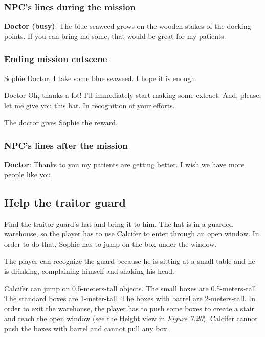 \subsubsection*{NPC's lines during the mission}
\textbf{Doctor (busy)}: The blue seaweed grows on the wooden stakes of the docking points. If you can bring me some, that would be great for my patients.

\subsubsection*{Ending mission cutscene}
\begin{screenplay}

\begin{dialogue}{Sophie}
Doctor, I take some blue seaweed. I hope it is enough.
\end{dialogue}

\begin{dialogue}{Doctor}
Oh, thanks a lot! I'll immediately start making some extract. And, please, let me give you this hat. In recognition of your efforts.
\end{dialogue}

The doctor gives Sophie the reward.

\end{screenplay}

\subsubsection*{NPC's lines after the mission}
\textbf{Doctor}: Thanks to you my patients are getting better. I wish we have more people like you.


\subsection{Help the traitor guard}
Find the traitor guard's hat and bring it to him. The hat is in a guarded warehouse, so the player has to use Calcifer to enter through an open window. In order to do that, Sophie has to jump on the box under the window.

The player can recognize the guard because he is sitting at a small table and he is drinking, complaining himself and shaking his head.

Calcifer can jump on 0,5-meters-tall objects. The small boxes are 0.5-meters-tall. The standard boxes are 1-meter-tall. The boxes with barrel are 2-meters-tall. In order to exit the warehouse, the player has to push some boxes to create a stair and reach the open window (see the Height view in \textit{Figure 7.20}). Calcifer cannot push the boxes with barrel and cannot pull any box.

